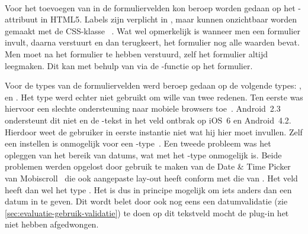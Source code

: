 \begin{table}[H]
\centering
{}
\caption{Gebruik van  voor \st{}~(\sta), \kendo{}~(\kendoa), \jqm{}~(\jqma) en \lungo{}~(\lungoa).}
\label{tabel:evaluatie-gebruik-formulieren}
\end{table}


\paragraph{\jqm} 
Voor het toevoegen van  in de formuliervelden kon beroep worden gedaan op het -attribuut in HTML5. 
Labels zijn verplicht in \jqm{}, maar kunnen onzichtbaar worden gemaakt met de CSS-klasse ~\cite{JQuery2013}. 
Wat wel opmerkelijk is wanneer men een formulier invult, daarna verstuurt en dan terugkeert, het formulier nog alle waarden bevat. 
Men moet na het formulier te hebben verstuurd, zelf het formulier altijd leegmaken. 
Dit kan met behulp van \js{} via de -functie op het formulier.
 
Voor de types van de formuliervelden werd beroep gedaan op de volgende types: ,  en . 
Het  type werd echter niet gebruikt om wille van twee redenen.
Ten eerste was hiervoor een slechte ondersteuning naar mobiele browsers toe~\cite{Deveria2013b}.
Android~2.3 ondersteunt dit niet en de -tekst in het veld ontbrak op iOS~6 en Android~4.2.
Hierdoor weet de gebruiker in eerste instantie niet wat hij hier moet invullen. 
Zelf een  instellen is onmogelijk voor een -type~\cite{Berjon2012}. 
Een tweede probleem was het opleggen van het bereik van datums, wat met het -type onmogelijk is. 
Beide problemen werden opgelost door gebruik te maken van de Date \& Time Picker van Mobiscroll~\cite{Mobiscroll2013} die ook aangepaste lay-out heeft conform met die van \jqm{}. 
Het veld heeft dan wel het type .
Het is dus in principe mogelijk om iets anders dan een datum in te geven. 
Dit wordt belet door ook nog eens een datumvalidatie (zie \ref{sec:evaluatie-gebruik-validatie}) te doen op dit tekstveld mocht de plug-in het niet hebben afgedwongen.
 
